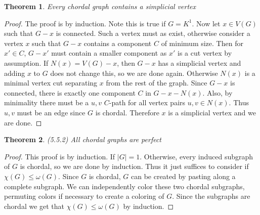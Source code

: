 \documentclass[12pt]{article}
\newtheorem{theorem}{Theorem}
\begin{document}
\begin{theorem} Every chordal graph contains a simplicial vertex
\end{theorem}
\begin{proof} The proof is by induction. Note this is true if
  $G = K^1$. Now let $x \in V(G)$ such that $G-x$ is connected. Such a
  vertex must as exist, otherwise consider a vertex $x$ such that
  $G-x$ contains a component $C$ of minimum size. Then for $x' \in C$,
  $G-x'$ must contain a smaller component as $x'$ is a cut vertex by
  assumption. If $N(x) = V(G) - x$, then $G-x$ has a simplicial vertex
  and adding $x$ to $G$ does not change this, so we are done
  again. Otherwise $N(x)$ is a minimal vertex cut separating $x$ from
  the rest of the graph. Since $G - x$ is connected, there is exactly
  one component $C$ in $G - x - N(x)$. Also, by minimality there must
  be a $u,v$ $C$-path for all vertex pairs $u,v \in N(x)$. Thus $u,v$
  must be an edge since $G$ is chordal. Therefore $x$ is a simplicial
  vertex and we are done.
\end{proof}

\begin{theorem} (5.5.2) All chordal graphs are perfect
\end{theorem}
\begin{proof} This proof is by induction. If $|G| = 1$. Otherwise,
  every induced subgraph of $G$ is chordal, so we are done by
  induction. Thus it just suffices to consider if
  $\chi(G) \leq \omega(G)$. Since $G$ is chordal, $G$ can be created
  by pasting along a complete subgraph. We can independently color
  these two chordal subgraphs, permuting colors if necessary to create
  a coloring of $G$. Since the subgraphs are chordal we get that
  $\chi(G) \leq \omega(G)$ by induction.
\end{proof}
\end{document}
